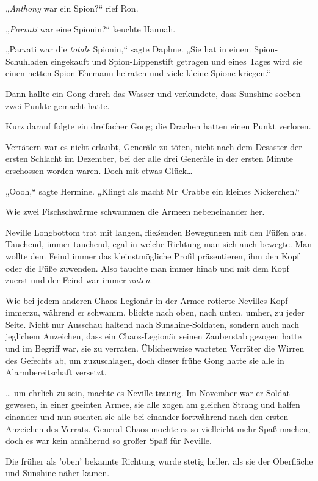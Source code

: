 {„\emph{Anthony} war ein Spion?“ rief Ron.

„\emph{Parvati} war eine Spionin?“ keuchte Hannah.

„Parvati war die \emph{totale} Spionin,“ sagte Daphne. „Sie hat in einem Spion-Schuhladen eingekauft und Spion-Lippenstift getragen und eines Tages wird sie einen netten Spion-Ehemann heiraten und viele kleine Spione kriegen.“

Dann hallte ein Gong durch das Wasser und verkündete, dass Sunshine soeben zwei Punkte gemacht hatte.

Kurz darauf folgte ein dreifacher Gong; die Drachen hatten einen Punkt verloren.

Verrätern war es nicht erlaubt, Generäle zu töten, nicht nach dem Desaster der ersten Schlacht im Dezember, bei der alle drei Generäle in der ersten Minute erschossen worden waren. Doch mit etwas Glück…

„Oooh,“ sagte Hermine. „Klingt als macht Mr~Crabbe ein kleines Nickerchen.“

\later

Wie zwei Fischschwärme schwammen die Armeen nebeneinander her.

Neville Longbottom trat mit langen, fließenden Bewegungen mit den Füßen aus. Tauchend, immer tauchend, egal in welche Richtung man sich auch bewegte. Man wollte dem Feind immer das kleinstmögliche Profil präsentieren, ihm den Kopf oder die Füße zuwenden. Also tauchte man immer hinab und mit dem Kopf zuerst und der Feind war immer \emph{unten}.

Wie bei jedem anderen Chaos-Legionär in der Armee rotierte Nevilles Kopf immerzu, während er schwamm, blickte nach oben, nach unten, umher, zu jeder Seite. Nicht nur Ausschau haltend nach Sunshine-Soldaten, sondern auch nach jeglichem Anzeichen, dass ein Chaos-Legionär seinen Zauberstab gezogen hatte und im Begriff war, sie zu verraten. Üblicherweise warteten Verräter die Wirren des Gefechts ab, um zuzuschlagen, doch dieser frühe Gong hatte sie alle in Alarmbereitschaft versetzt.

… um ehrlich zu sein, machte es Neville traurig. Im November war er Soldat gewesen, in einer geeinten Armee, sie alle zogen am gleichen Strang und halfen einander und nun suchten sie alle bei einander fortwährend nach den ersten Anzeichen des Verrats. General Chaos mochte es so vielleicht mehr Spaß machen, doch es war kein annähernd so großer Spaß für Neville.

Die früher als 'oben' bekannte Richtung wurde stetig heller, als sie der Oberfläche und Sunshine näher kamen.

}
